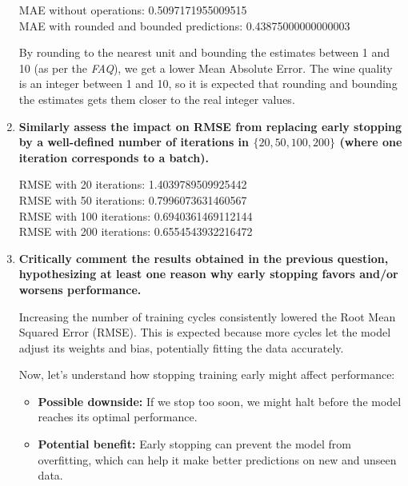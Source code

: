 \documentclass[12pt]{article}
\begin{document}
\begin{enumerate}[leftmargin=\labelsep]
          \vskip 0.3cm
          

          MAE without operations: 0.5097171955009515 \\
          MAE with rounded and bounded predictions: 0.43875000000000003

          \vskip 0.2cm
          By rounding to the nearest unit and bounding the estimates between 1 and 10 (as per the \textit{FAQ}), we get a lower Mean Absolute Error.
          The wine quality is an integer between 1 and 10, so it is expected that rounding and bounding the estimates gets them closer to the real integer values.

    \item \textbf{Similarly assess the impact on RMSE from replacing early stopping by a well-defined
          number of iterations in $\{20,50,100,200\}$ (where one iteration corresponds to a batch).}

          \vskip 0.3cm
          

          RMSE with 20 iterations: 1.4039789509925442  \\
          RMSE with 50 iterations: 0.7996073631460567  \\
          RMSE with 100 iterations: 0.6940361469112144 \\
          RMSE with 200 iterations: 0.6554543932216472

    \item \textbf{Critically comment the results obtained in the previous question, hypothesizing at least
          one reason why early stopping favors and/or worsens performance.}

          \vskip 0.3cm

          Increasing the number of training cycles consistently lowered the Root Mean Squared Error (RMSE). This is expected because more cycles let the model adjust its weights and bias, potentially fitting the data accurately.

          Now, let's understand how stopping training early might affect performance:

          \begin{itemize}
            \item \textbf{Possible downside:} If we stop too soon, we might halt before the model reaches its optimal performance.
            \item \textbf{Potential benefit:} Early stopping can prevent the model from overfitting, which can help it make better predictions on new and unseen data.
          \end{itemize}
\end{enumerate}
\end{document}
